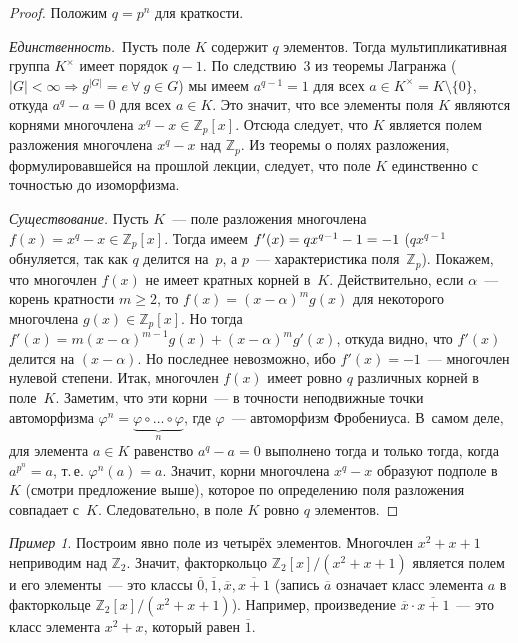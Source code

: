 \documentclass[a4paper, 12pt]{article}
\def\ZZ{{\mathbb Z}}%
\theoremstyle{definition}
\theoremstyle{remark}
\newtheorem{example}{Пример}
\begin{document}
\begin{proof}
Положим $q = p^n$ для краткости.

{\it Единственность.}\ Пусть поле $K$ содержит $q$ элементов. Тогда
мультипликативная группа $K^{\times}$ имеет порядок $q-1$. По
следствию~3 из теоремы Лагранжа ($|G| < \infty \Rightarrow g^{|G|} = e\ \forall\ g \in G$) мы имеем $a^{q-1}=1$ для всех $a \in K^{\times} = K \setminus \{0\}$, откуда $a^q - a = 0$ для всех $a\in K$. Это
значит, что все элементы поля $K$ являются корнями многочлена $x^q -
x \in \ZZ_p[x]$. Отсюда следует, что $K$ является полем разложения
многочлена $x^q - x$ над $\ZZ_p$. Из теоремы о полях разложения,
формулировавшейся на прошлой лекции, следует, что поле $K$
единственно с точностью до изоморфизма.

\smallskip

{\it Существование.} Пусть $K$~--- поле разложения многочлена $f(x)
= x^q - x \in \ZZ_p[x]$. Тогда имеем $f'(x)= qx^{q-1} - 1 =\nobreak
-1$ ($qx^{q-1}$ обнуляется, так как $q$ делится на~$p$, а $p$~---
характеристика поля~$\ZZ_p$). Покажем, что многочлен $f(x)$ не имеет
кратных корней в~$K$. Действительно, если $\alpha$~--- корень
кратности $m \geqslant 2$, то $f(x) = (x - \alpha)^m g(x)$ для
некоторого многочлена $g(x) \in \ZZ_p[x]$. Но тогда $f'(x) =
m(x-\alpha)^{m-1} g(x) + (x - \alpha)^m g'(x)$, откуда видно, что
$f'(x)$ делится на $(x - \alpha)$. Но последнее невозможно, ибо
$f'(x) = -1$~--- многочлен нулевой степени. Итак, многочлен $f(x)$
имеет ровно $q$ различных корней в поле~$K$. Заметим, что эти
корни~--- в точности неподвижные точки автоморфизма $\varphi^n =
\underbrace{\varphi \circ \ldots \circ \varphi}_n$, где
$\varphi$~--- автоморфизм Фробениуса. В~самом деле, для элемента $a
\in K$ равенство $a^q - a = 0$ выполнено тогда и только тогда, когда
$a^{p^n} = a$, т.\,е. $\varphi^n(a) = a$. Значит, корни многочлена
$x^q-x$ образуют подполе в~$K$ (смотри предложение выше), которое по определению поля
разложения совпадает с~$K$. Следовательно, в поле $K$ ровно $q$
элементов.
\end{proof}

\begin{example}
Построим явно поле из четырёх элементов. Многочлен $x^2+x+1$
неприводим над $\ZZ_2$. Значит, факторкольцо $\ZZ_2[x]/(x^2+x+1)$
является полем и его элементы~--- это классы $\overline{0},
\overline{1}, \overline{x}, \overline{x+1}$ (запись $\overline a$
означает класс элемента $a$ в факторкольце $\ZZ_2[x]/(x^2+x+1)$).
Например, произведение $\overline{x} \cdot \overline{x+1}$~--- это
класс элемента $x^2+x$, который равен $\overline{1}$.
\end{example}
\end{document}
